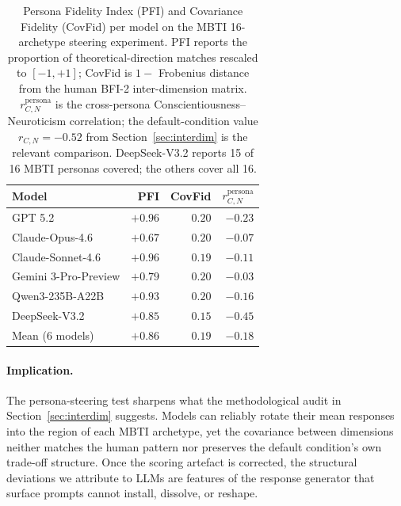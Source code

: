 \documentclass[11pt]{article}
\begin{document}
\begin{table}[!htb]
\centering
\caption{Persona Fidelity Index (PFI) and Covariance Fidelity (CovFid) per model on the MBTI 16-archetype steering experiment. PFI reports the proportion of theoretical-direction matches rescaled to $[-1, +1]$; CovFid is $1 -$ Frobenius distance from the human BFI-2 inter-dimension matrix. $r_{C, N}^{\mathrm{persona}}$ is the cross-persona Conscientiousness--Neuroticism correlation; the default-condition value $r_{C, N} = -0.52$ from Section~\ref{sec:interdim} is the relevant comparison. DeepSeek-V3.2 reports 15 of 16 MBTI personas covered; the others cover all 16.}
\label{tab:mbti_summary}
\footnotesize
\begin{tabular}{lrrr}
\toprule
Model & PFI & CovFid & $r_{C, N}^{\mathrm{persona}}$ \\
\midrule
GPT 5.2                 & $+0.96$ & $0.20$ & $-0.23$ \\
Claude-Opus-4.6          & $+0.67$ & $0.20$ & $-0.07$ \\
Claude-Sonnet-4.6        & $+0.96$ & $0.19$ & $-0.11$ \\
Gemini 3-Pro-Preview     & $+0.79$ & $0.20$ & $-0.03$ \\
Qwen3-235B-A22B          & $+0.93$ & $0.20$ & $-0.16$ \\
DeepSeek-V3.2            & $+0.85$ & $0.15$ & $-0.45$ \\
\midrule
Mean (6 models)          & $+0.86$ & $0.19$ & $-0.18$ \\
\bottomrule
\end{tabular}
\end{table}

\paragraph{Implication.}
The persona-steering test sharpens what the methodological audit in Section~\ref{sec:interdim} suggests.
Models can reliably rotate their mean responses into the region of each MBTI archetype, yet the covariance between dimensions neither matches the human pattern nor preserves the default condition's own trade-off structure.
Once the scoring artefact is corrected, the structural deviations we attribute to LLMs are features of the response generator that surface prompts cannot install, dissolve, or reshape.
\end{document}
